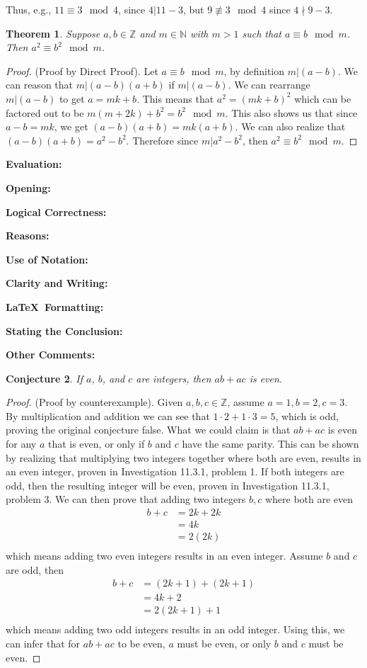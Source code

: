 \documentclass[11pt,titlepage]{article}		%
\def\rubric{\textbf{Evaluation:} \makebox[0.75in]{\hrulefill}

\vspace{.3in}

\textbf{Opening:} \makebox[0.75in]{\hrulefill}

\vspace{.3in}

\textbf{Logical Correctness:} \makebox[0.75in]{\hrulefill}

\vspace{.3in}

\textbf{Reasons:} \makebox[0.75in]{\hrulefill}

\vspace{.3in}

\textbf{Use of Notation:} \makebox[0.75in]{\hrulefill}

\vspace{.3in}

\textbf{Clarity and Writing:} \makebox[0.75in]{\hrulefill}

\vspace{.3in}

\textbf{\LaTeX\ Formatting:} \makebox[0.75in]{\hrulefill}

\vspace{.3in}

\textbf{Stating the Conclusion:} \makebox[0.75in]{\hrulefill}

\vspace{.3in}

\textbf{Other Comments:}

\vspace{1in}

}
\def\Z{{\mathbb Z}}
\def\N{{\mathbb N}}
\newtheorem{theorem}{Theorem}
\newtheorem{conjecture}[theorem]{Conjecture}
\theoremstyle{definition}
\theoremstyle{theorem}
\begin{document}
Thus, e.g., $11\equiv 3\mod 4$, since $4|11-3$, but $9\not\equiv 3\mod 4$ since $4\nmid 9-3$.

\begin{theorem}\label{thm:modular-squares}
    Suppose $a,b\in \Z$ and $m\in \N$ with $m > 1$ such that $a\equiv b\mod m$.
    Then $a^2 \equiv b^2\mod m$.
\end{theorem}

\begin{proof}
    (Proof by Direct Proof). Let $a \equiv b\mod m$, by definition $m|(a-b)$. We can reason that $m|(a-b)(a+b)$ if $m|(a-b)$. We can rearrange $m|(a-b)$ to get $a=mk+b$. This means that $a^2=(mk+b)^2$ which can be factored out to be $m(m+2k)+b^2=b^2\mod m$.  This also shows us that since $a-b=mk$, we get $(a-b)(a+b)=mk(a+b)$. We can also realize that $(a-b)(a+b) = a^2-b^2$. Therefore since $m|a^2-b^2$, then $a^2 \equiv b^2\mod m$.
\end{proof}

\rubric



\clearpage

 

\begin{conjecture}
    If $a$, $b$, and $c$ are integers, then $ab+ac$ is even.
\end{conjecture}

\begin{proof}
    (Proof by counterexample). Given $a,b,c \in\Z$, assume $a=1,b=2,c=3$. By multiplication and addition we can see that $1\cdot2+1\cdot3=5$, which is odd, proving the original conjecture false. What we could claim is that $ab+ac$ is even for any $a$ that is even, or only if $b$ and $c$ have the same parity.
    This can be shown by realizing that multiplying two integers together where both are even, results in an even integer, proven in Investigation 11.3.1, problem 1.
    If both integers are odd, then the resulting integer will be even, proven in Investigation 11.3.1, problem 3.
    We can then prove that adding two integers $b,c$ where both are even
    \begin{align*}
            b + c & = 2k + 2k\\
            & = 4k\\
            & = 2(2k)\\
    \end{align*}
    which means adding two even integers results in an even integer.
    Assume $b$ and $c$ are odd, then
    \begin{align*}
            b + c & = (2k+1) + (2k+1)\\
            & = 4k+2\\
            & = 2(2k+1)+1\\
    \end{align*}
    which means adding two odd integers results in an odd integer.
    Using this, we can infer that for $ab+ac$ to be even, $a$ must be even, or only $b$ and $c$ must be even.
    
\end{proof}
\end{document}
